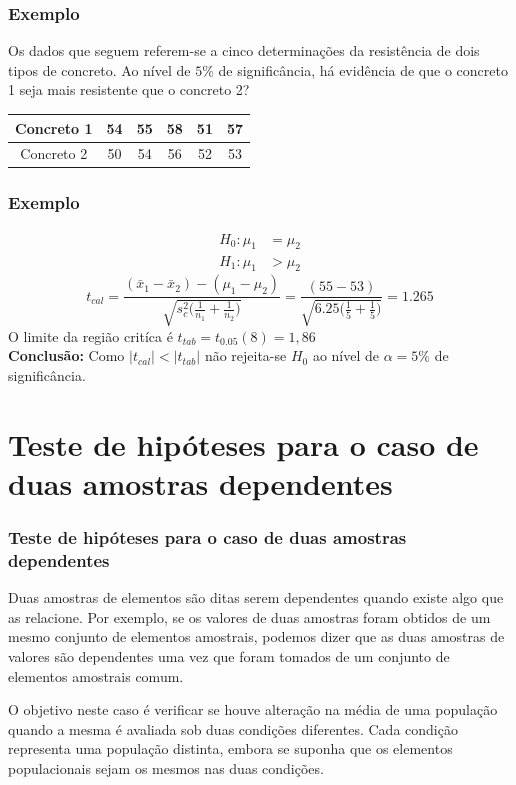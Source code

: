 \documentclass[14pt,aspectratio=1610]{beamer}
\newcommand{\bx}{\ensuremath{\bar{x}}}
\newcommand{\Ho}{\ensuremath{H_{0}}}
\begin{document}
\begin{frame}{}
\frametitle{Exemplo}
\begin{block}{}
\justifying
Os dados que seguem referem-se a cinco determinações da resistência de dois tipos de concreto. Ao nível de $5\%$ de significância, há evidência de que o concreto 
1 seja mais resistente que o concreto 2?
\begin{table}[]
\begin{tabular}{c|ccccc}
Concreto 1 & 54 & 55 & 58 & 51 & 57 \\ \hline
Concreto 2 & 50 & 54 & 56 & 52 & 53
\end{tabular}
\end{table}
\end{block}
\end{frame}

\begin{frame}{}
\frametitle{Exemplo}
\begin{block}{}
\justifying
\begin{align*}
H_{0}: \mu_{1}&=\mu_{2} \\ 
H_{1}: \mu_{1}&> \mu_{2}
\end{align*}
$$t_{cal}=\dfrac{(\bx_{1}-\bx_{2})-(\mu_{1}-\mu_{2})}{\sqrt{s_{c}^{2}\Biggl(\frac{1}{n_{1}}+\frac{1}{n_{2}}\Biggl)}}=
                 \dfrac{(55-53)}{\sqrt{6.25\Biggl(\frac{1}{5}+\frac{1}{5}\Biggl)}}=1.265$$
O limite da região critíca é $t_{tab}=t_{0.05}(8)=1,86$\\
\textbf{Conclusão:} Como $|t_{cal}|<|t_{tab}|$ não rejeita-se $\Ho$ ao nível de $\alpha=5\%$ de significância.
\end{block}
\end{frame}

\section{Teste de hipóteses para o caso de duas amostras dependentes}
\begin{frame}{}
\frametitle{Teste de hipóteses para o caso de duas amostras dependentes}
\begin{block}{}
\justifying
Duas amostras de elementos são ditas serem dependentes quando existe algo que as relacione. Por exemplo, se os valores de duas amostras foram obtidos de um mesmo conjunto de elementos amostrais, podemos dizer que as duas amostras de valores são dependentes uma vez que foram tomados de um conjunto de elementos
amostrais comum.
\end{block}
\pause
\begin{block}{}
\justifying
O objetivo neste caso é verificar se houve alteração na média de uma população
quando a mesma é avaliada sob duas condições diferentes. Cada condição representa
uma população distinta, embora se suponha que os elementos populacionais sejam os
mesmos nas duas condições.
\end{block}
\end{frame}
\end{document}
